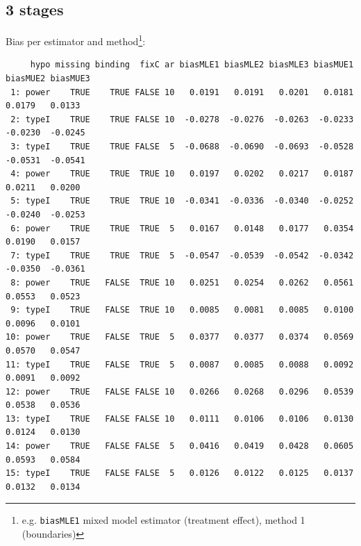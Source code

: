 \documentclass[12pt]{article}
\begin{document}
\subsection{3 stages}
\label{sec:orgf87ffa6}
Bias per estimator and method\footnote{e.g. \texttt{biasMLE1} mixed model
estimator (treatment effect), method 1 (boundaries)}:
\begin{adjustwidth}{-1cm}{-1cm}
\begin{verbatim}
     hypo missing binding  fixC ar biasMLE1 biasMLE2 biasMLE3 biasMUE1 biasMUE2 biasMUE3
 1: power    TRUE    TRUE FALSE 10   0.0191   0.0191   0.0201   0.0181   0.0179   0.0133
 2: typeI    TRUE    TRUE FALSE 10  -0.0278  -0.0276  -0.0263  -0.0233  -0.0230  -0.0245
 3: typeI    TRUE    TRUE FALSE  5  -0.0688  -0.0690  -0.0693  -0.0528  -0.0531  -0.0541
 4: power    TRUE    TRUE  TRUE 10   0.0197   0.0202   0.0217   0.0187   0.0211   0.0200
 5: typeI    TRUE    TRUE  TRUE 10  -0.0341  -0.0336  -0.0340  -0.0252  -0.0240  -0.0253
 6: power    TRUE    TRUE  TRUE  5   0.0167   0.0148   0.0177   0.0354   0.0190   0.0157
 7: typeI    TRUE    TRUE  TRUE  5  -0.0547  -0.0539  -0.0542  -0.0342  -0.0350  -0.0361
 8: power    TRUE   FALSE  TRUE 10   0.0251   0.0254   0.0262   0.0561   0.0553   0.0523
 9: typeI    TRUE   FALSE  TRUE 10   0.0085   0.0081   0.0085   0.0100   0.0096   0.0101
10: power    TRUE   FALSE  TRUE  5   0.0377   0.0377   0.0374   0.0569   0.0570   0.0547
11: typeI    TRUE   FALSE  TRUE  5   0.0087   0.0085   0.0088   0.0092   0.0091   0.0092
12: power    TRUE   FALSE FALSE 10   0.0266   0.0268   0.0296   0.0539   0.0538   0.0536
13: typeI    TRUE   FALSE FALSE 10   0.0111   0.0106   0.0106   0.0130   0.0124   0.0130
14: power    TRUE   FALSE FALSE  5   0.0416   0.0419   0.0428   0.0605   0.0593   0.0584
15: typeI    TRUE   FALSE FALSE  5   0.0126   0.0122   0.0125   0.0137   0.0132   0.0134
\end{verbatim}
\end{adjustwidth}
\end{document}
